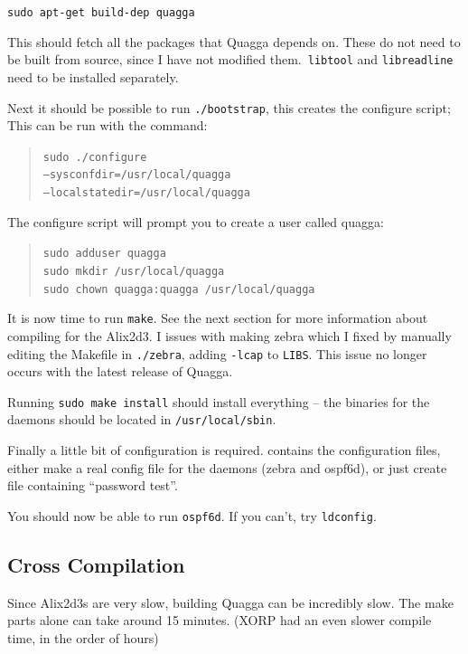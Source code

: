 \texttt{sudo apt-get build-dep quagga}

This should fetch all the packages that Quagga depends on. These do not need to
be built from source, since I have not modified them.\ \texttt{libtool} and
\texttt{libreadline} need to be installed separately. 

Next it should be possible to run \texttt{\@./bootstrap}, this creates the
configure script; This can be run with the command:

\begin{quote}
\texttt{sudo \@./configure \\ --sysconfdir=/usr/local/quagga \\ --localstatedir=/usr/local/quagga}
\end{quote}

The configure script will prompt you to create a user called quagga:

\begin{quote}
\texttt{sudo adduser quagga} \\
\texttt{sudo mkdir /usr/local/quagga} \\
\texttt{sudo chown quagga:quagga /usr/local/quagga} 
\end{quote}

It is now time to run \texttt{make}. See the next section for more information
about compiling for the Alix2d3. I issues with making zebra which I fixed
by manually editing the Makefile in \texttt{\@./zebra}, adding \texttt{-lcap}
to \texttt{LIBS}\@. This issue no longer occurs with the latest release of
Quagga.

Running \texttt{sudo make install} should install everything -- the binaries for the daemons
should be located in \texttt{/usr/local/sbin}.

Finally a little bit of configuration is required. 
contains the configuration files, either make a real config file for the
daemons (zebra and ospf6d), or just create file containing ``password test''.

You should now be able to run \texttt{ospf6d}. If you can't, try \texttt{ldconfig}.

\subsection*{Cross Compilation}
\label{cross_compile}
Since Alix2d3s are very slow, building Quagga can be incredibly slow. The make
parts alone can take around 15 minutes. (XORP had an even slower compile time,
in the order of hours) 

